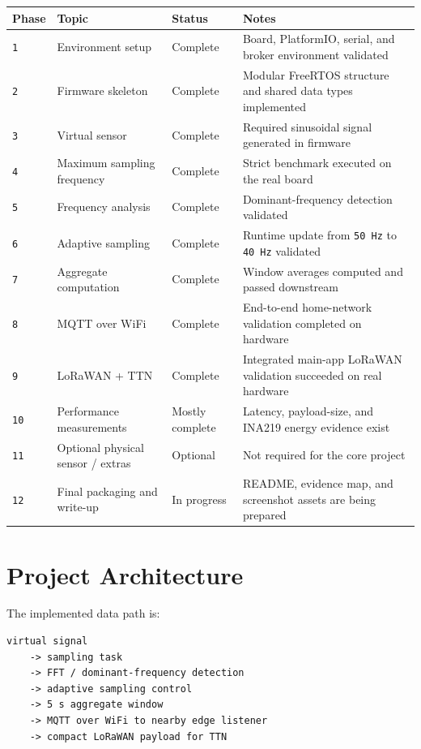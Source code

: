 \documentclass[12pt,a4paper]{article}
\begin{document}
\begin{longtable}{|>{\raggedright\arraybackslash}p{}|>{\raggedright\arraybackslash}p{}|>{\raggedright\arraybackslash}p{}|>{\raggedright\arraybackslash}p{}|}
\hline
\textbf{Phase} & \textbf{Topic} & \textbf{Status} & \textbf{Notes} \\
\hline
\texttt{1} & Environment setup & Complete & Board, PlatformIO, serial, and broker environment validated \\
\hline
\texttt{2} & Firmware skeleton & Complete & Modular FreeRTOS structure and shared data types implemented \\
\hline
\texttt{3} & Virtual sensor & Complete & Required sinusoidal signal generated in firmware \\
\hline
\texttt{4} & Maximum sampling frequency & Complete & Strict benchmark executed on the real board \\
\hline
\texttt{5} & Frequency analysis & Complete & Dominant-frequency detection validated \\
\hline
\texttt{6} & Adaptive sampling & Complete & Runtime update from \texttt{50 Hz} to \texttt{40 Hz} validated \\
\hline
\texttt{7} & Aggregate computation & Complete & Window averages computed and passed downstream \\
\hline
\texttt{8} & MQTT over WiFi & Complete & End-to-end home-network validation completed on hardware \\
\hline
\texttt{9} & LoRaWAN + TTN & Complete & Integrated main-app LoRaWAN validation succeeded on real hardware \\
\hline
\texttt{10} & Performance measurements & Mostly complete & Latency, payload-size, and INA219 energy evidence exist \\
\hline
\texttt{11} & Optional physical sensor / extras & Optional & Not required for the core project \\
\hline
\texttt{12} & Final packaging and write-up & In progress & README, evidence map, and screenshot assets are being prepared \\
\hline
\end{longtable}

\section{Project Architecture}

The implemented data path is:

\begin{lstlisting}
virtual signal
    -> sampling task
    -> FFT / dominant-frequency detection
    -> adaptive sampling control
    -> 5 s aggregate window
    -> MQTT over WiFi to nearby edge listener
    -> compact LoRaWAN payload for TTN
\end{lstlisting}
\end{document}
